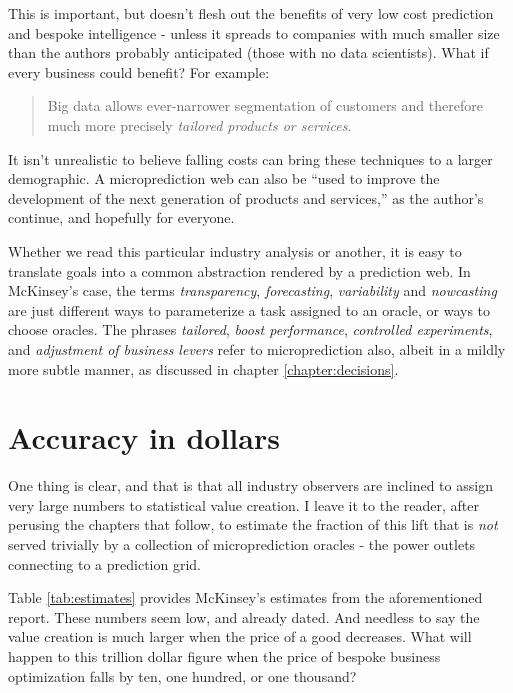 This is important, but doesn't flesh out the benefits of very low cost prediction and bespoke intelligence - unless it spreads to companies with much smaller size than the authors probably anticipated (those with no data scientists). What if every business could benefit? For example:
\begin{quotation}
Big data allows ever-narrower segmentation of customers and therefore much more precisely {\em tailored products or services}. 
\end{quotation}
It isn't unrealistic to believe falling costs can bring these techniques to a larger demographic. A microprediction web can also be ``used to improve the development of the next generation of products and services,'' as the author's continue, and hopefully for everyone. 

Whether we read this particular industry analysis or another, it is easy to translate goals into a common abstraction rendered by a prediction web. In McKinsey's case, the terms {\em transparency}, {\em forecasting}, {\em variability} and {\em nowcasting} are just different ways to parameterize a task assigned to an oracle, or ways to choose oracles. The phrases {\em tailored}, {\em boost performance}, {\em controlled experiments}, and {\em adjustment of business levers} refer to microprediction also, albeit in a mildly more subtle manner, as discussed in chapter \ref{chapter:decisions}.

\section{Accuracy in dollars}

One thing is clear, and that is that all industry observers are inclined to assign very large numbers to statistical value creation. I leave it to the reader, after perusing the chapters that follow, to estimate the fraction of this lift that is {\em not} served trivially by a collection of microprediction oracles - the power outlets connecting to a prediction grid. 

Table \ref{tab:estimates} provides McKinsey's estimates from the aforementioned report. These numbers seem low, and already dated. And needless to say the value creation is much larger when the price of a good decreases. What will happen to this trillion dollar figure when the price of bespoke business optimization falls by ten, one hundred, or one thousand? 

